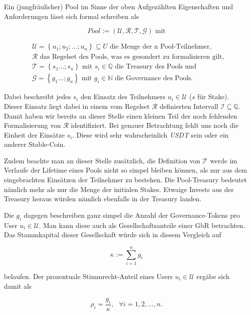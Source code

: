 \begin{Def}\label{defPool}

Ein (jungfräulicher) Pool im Sinne der oben Aufgezählten Eigenschaften und Anforderungen lässt sich formal schreiben als

\begin{equation*}
  Pool := \left( \mathcal{U}, \mathcal{R}, \mathcal{T}, \mathcal{G} \right) \text{ mit}
\end{equation*}

\begin{align*}
  & \mathcal{U} = \left\{ u_1; u_2;...;u_n \right\} \subseteq U \text{ die Menge der n Pool-Teilnehmer, } \\
  & \mathcal{R} \text{ das Regelset des Pools, was es gesondert zu formalisieren gilt, } \\
  & \mathcal{T} = \left\{ s_1...;s_n \right\} \text{ mit } s_i \in \mathbb{Q} \text{ die Treasury des Pools und} \\
  & \mathcal{G} = \left\{ g_1...;g_n \right\} \text{ mit } g_i \in \mathbb{N} \text{ die Governance des Pools.}
\end{align*}

\vspace{0.2cm}

Dabei beschreibt jedes $s_i$ den Einsatz des Teilnehmers $u_i \in \mathcal{U}$ ($s$ für Stake). Dieser Einsatz liegt dabei in einem vom Regelset $\mathcal{R}$ definierten Intervall $\mathcal{I} \subseteq \mathbb{Q}$. Damit haben wir bereits an dieser Stelle einen kleinen Teil der noch fehlenden Formalisierung von $\mathcal{R}$ identifiziert. Bei genauer Betrachtung fehlt uns noch die Einheit der Einsätze $s_i$. Diese wird sehr wahrscheinlich \textit{USDT} sein oder ein anderer Stable-Coin.

Zudem beachte man an dieser Stelle zusätzlich, die Definition von $\mathcal{T}$ werde im Verlaufe der Lifetime eines Pools nicht so simpel bleiben können, als nur aus dem eingebrachten Einsätzen der Teilnehmer zu bestehen. Die Pool-Treasury bedeutet nämlich mehr als nur die Menge der initialen Stakes. Etwaige Invests aus der Treasury heraus würden nämlich ebenfalls in der Treasury landen.

\vspace{0.2cm} 

Die $g_i$ dagegen beschreiben ganz simpel die Anzahl der Governance-Tokens pro User $u_i \in \mathcal{U}$. Man kann diese auch als Gesellschaftsanteile einer GbR betrachten. Das Stammkapital dieser Gesellschaft würde sich in diesem Vergleich auf

\begin{equation*}
  \kappa := \sum_{i=1}^{n} g_i 
\end{equation*}

belaufen. Der prozentuale Stimmrecht-Anteil eines Users $u_i \in \mathcal{U}$ ergäbe sich damit als 

\begin{equation*}
  \rho_i = \frac{g_i}{\kappa}, \text{   } \forall i = 1, 2, ...,n. 
\end{equation*}

\end{Def}


